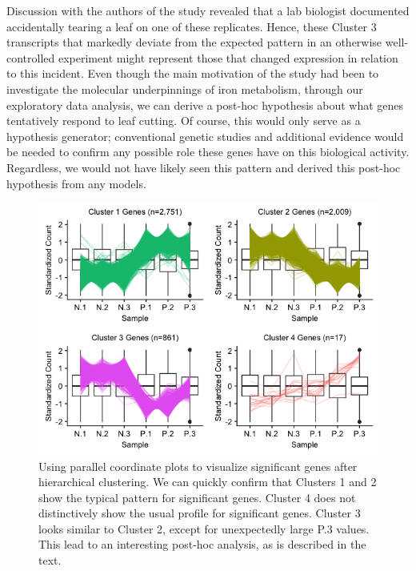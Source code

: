 \documentclass{bioinfo}
\begin{document}
Discussion with the authors of the study revealed that a lab biologist documented accidentally tearing a leaf on one of these replicates. Hence, these Cluster 3 transcripts that markedly deviate from the expected pattern in an otherwise well-controlled experiment might represent those that changed expression in relation to this incident. Even though the main motivation of the study had been to investigate the molecular underpinnings of iron metabolism, through our exploratory data analysis, we can derive a post-hoc hypothesis about what genes tentatively respond to leaf cutting. Of course, this would only serve as a hypothesis generator; conventional genetic studies and additional evidence would be needed to confirm any possible role these genes have on this biological activity. Regardless, we would not have likely seen this pattern and derived this post-hoc hypothesis from any models.

\begin{figure}[!tpb]
\centerline{\includegraphics[width=\columnwidth]{../MakeFigures/sbIRClustersSig.jpg}}
\caption{Using parallel coordinate plots to visualize significant genes after hierarchical clustering. We can quickly confirm that Clusters 1 and 2 show the typical pattern for significant genes. Cluster 4 does not distinctively show the usual profile for significant genes. Cluster 3 looks similar to Cluster 2, except for unexpectedly large P.3 values. This lead to an interesting post-hoc analysis, as is described in the text.
\label{sbIRClustersSig}}
\end{figure}
\end{document}
